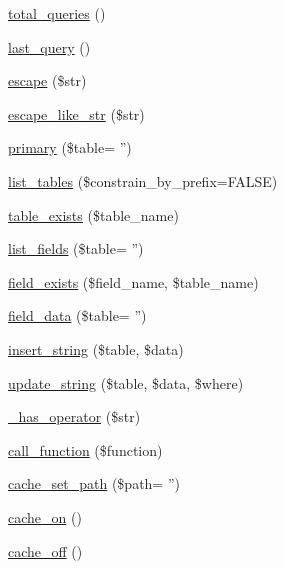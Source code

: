 \begin{DoxyCompactItemize}
\item 
\hyperlink{class_c_i___d_b__driver_a8fc0b6551e1ca0c68c6e3a66b27310fc}{total\-\_\-queries} ()
\item 
\hyperlink{class_c_i___d_b__driver_a8117354f1fa0b2873f0ad2792dc21389}{last\-\_\-query} ()
\item 
\hyperlink{class_c_i___d_b__driver_ac8f37ca5703d4558c732e692194f8cd6}{escape} (\$str)
\item 
\hyperlink{class_c_i___d_b__driver_a1a15f371afab8d5cfb35e38fc53c620f}{escape\-\_\-like\-\_\-str} (\$str)
\item 
\hyperlink{class_c_i___d_b__driver_a3d2117201e5db13e941115de079f9a21}{primary} (\$table= '')
\item 
\hyperlink{class_c_i___d_b__driver_accef90659bed312aba1c3df80620b402}{list\-\_\-tables} (\$constrain\-\_\-by\-\_\-prefix=F\-A\-L\-S\-E)
\item 
\hyperlink{class_c_i___d_b__driver_af148cb2cd5d490d2a480c0c741ceed03}{table\-\_\-exists} (\$table\-\_\-name)
\item 
\hyperlink{class_c_i___d_b__driver_a255348162714d410002f3d8486ba929d}{list\-\_\-fields} (\$table= '')
\item 
\hyperlink{class_c_i___d_b__driver_ad349ffee1eed59a2eb8f0f1d3033764f}{field\-\_\-exists} (\$field\-\_\-name, \$table\-\_\-name)
\item 
\hyperlink{class_c_i___d_b__driver_afcd5085e45ddefbb7c0b22e50703eade}{field\-\_\-data} (\$table= '')
\item 
\hyperlink{class_c_i___d_b__driver_ad27720d886add2c9abf9ac48a9ff56d5}{insert\-\_\-string} (\$table, \$data)
\item 
\hyperlink{class_c_i___d_b__driver_af9eb76a74d10fa81e44ecb0dd9bf00d4}{update\-\_\-string} (\$table, \$data, \$where)
\item 
\hyperlink{class_c_i___d_b__driver_a2e0ab20a3cd2941eaa854fe0b4a81e6b}{\-\_\-has\-\_\-operator} (\$str)
\item 
\hyperlink{class_c_i___d_b__driver_af7892f758c89d0e243def92140dbe099}{call\-\_\-function} (\$function)
\item 
\hyperlink{class_c_i___d_b__driver_a965799367e0e6a11b084f404dc86b631}{cache\-\_\-set\-\_\-path} (\$path= '')
\item 
\hyperlink{class_c_i___d_b__driver_a69ca9bb8bc31400922a565d5c4d64d8d}{cache\-\_\-on} ()
\item 
\hyperlink{class_c_i___d_b__driver_ae577e2be88cb5f0d184f76dc6fd87482}{cache\-\_\-off} ()
\item 

\end{DoxyCompactItemize}
